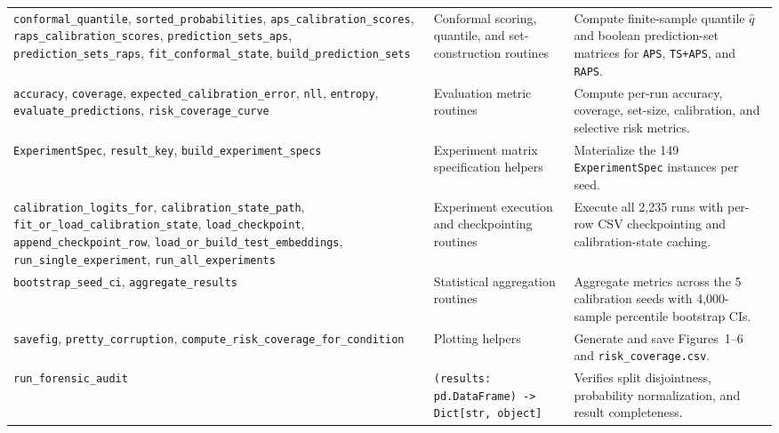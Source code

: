 \documentclass[11pt,a4paper]{article}
\begin{document}
{\begin{longtable}{P{0.30\textwidth} P{0.29\textwidth} P{0.34\textwidth}}
\texttt{conformal\_\allowbreak{}quantile}, \texttt{sorted\_\allowbreak{}probabilities}, \texttt{aps\_\allowbreak{}calibration\_\allowbreak{}scores}, \texttt{raps\_\allowbreak{}calibration\_\allowbreak{}scores}, \texttt{prediction\_\allowbreak{}sets\_\allowbreak{}aps}, \texttt{prediction\_\allowbreak{}sets\_\allowbreak{}raps}, \texttt{fit\_\allowbreak{}conformal\_\allowbreak{}state}, \texttt{build\_\allowbreak{}prediction\_\allowbreak{}sets} & Conformal scoring, quantile, and set-construction routines & Compute finite-sample quantile $\hat{q}$ and boolean prediction-set matrices for \texttt{APS}, \texttt{TS+APS}, and \texttt{RAPS}. \\
\texttt{accuracy}, \texttt{coverage}, \texttt{expected\_\allowbreak{}calibration\_\allowbreak{}error}, \texttt{nll}, \texttt{entropy}, \texttt{evaluate\_\allowbreak{}predictions}, \texttt{risk\_\allowbreak{}coverage\_\allowbreak{}curve} & Evaluation metric routines & Compute per-run accuracy, coverage, set-size, calibration, and selective risk metrics. \\
\texttt{ExperimentSpec}, \texttt{result\_\allowbreak{}key}, \texttt{build\_\allowbreak{}experiment\_\allowbreak{}specs} & Experiment matrix specification helpers & Materialize the 149 \texttt{ExperimentSpec} instances per seed. \\
\texttt{calibration\_\allowbreak{}logits\_\allowbreak{}for}, \texttt{calibration\_\allowbreak{}state\_\allowbreak{}path}, \texttt{fit\_\allowbreak{}or\_\allowbreak{}load\_\allowbreak{}calibration\_\allowbreak{}state}, \texttt{load\_\allowbreak{}checkpoint}, \texttt{append\_\allowbreak{}checkpoint\_\allowbreak{}row}, \texttt{load\_\allowbreak{}or\_\allowbreak{}build\_\allowbreak{}test\_\allowbreak{}embeddings}, \texttt{run\_\allowbreak{}single\_\allowbreak{}experiment}, \texttt{run\_\allowbreak{}all\_\allowbreak{}experiments} & Experiment execution and checkpointing routines & Execute all 2,235 runs with per-row CSV checkpointing and calibration-state caching. \\
\texttt{bootstrap\_\allowbreak{}seed\_\allowbreak{}ci}, \texttt{aggregate\_\allowbreak{}results} & Statistical aggregation routines & Aggregate metrics across the 5 calibration seeds with 4,000-sample percentile bootstrap CIs. \\
\texttt{savefig}, \texttt{pretty\_\allowbreak{}corruption}, \texttt{compute\_\allowbreak{}risk\_\allowbreak{}coverage\_\allowbreak{}for\_\allowbreak{}condition} & Plotting helpers & Generate and save Figures~1--6 and \texttt{risk\_\allowbreak{}coverage.csv}. \\
\texttt{run\_\allowbreak{}forensic\_\allowbreak{}audit} & \texttt{(results: pd.DataFrame) -> Dict[str, object]} & Verifies split disjointness, probability normalization, and result completeness. \\
\end{longtable}}
\end{document}
